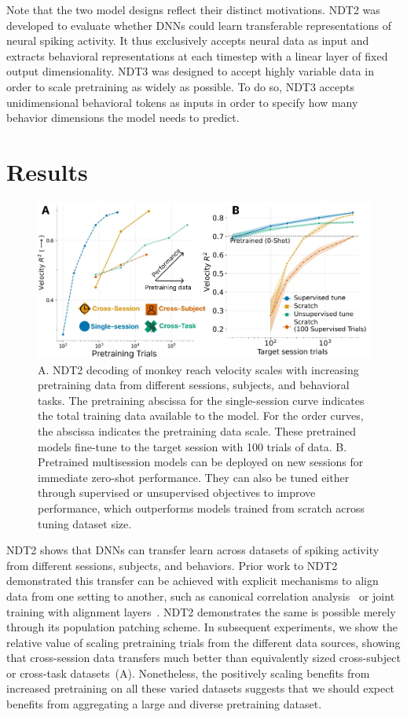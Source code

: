 \documentclass[12pt,oneside]{report}
\begin{document}
Note that the two model designs reflect their distinct motivations. NDT2 was developed to evaluate whether DNNs could learn transferable representations of neural spiking activity. It thus exclusively accepts neural data as input and extracts behavioral representations at each timestep with a linear layer of fixed output dimensionality. NDT3 was designed to accept highly variable data in order to scale pretraining as widely as possible. To do so, NDT3 accepts unidimensional behavioral tokens as inputs in order to specify how many behavior dimensions the model needs to predict.

\section{Results}


\begin{figure}[h]
  \centering
  \includegraphics[width=0.8\linewidth]{ch2_ndt2_results.png}
  \caption{A. NDT2 decoding of monkey reach velocity scales with increasing pretraining data from different sessions, subjects, and behavioral tasks. The pretraining abscissa for the single-session curve indicates the total training data available to the model. For the order curves, the abscissa indicates the pretraining data scale. These pretrained models fine-tune to the target session with 100 trials of data. B. Pretrained multisession models can be deployed on new sessions for immediate zero-shot performance. They can also be tuned either through supervised or unsupervised objectives to improve performance, which outperforms models trained from scratch across tuning dataset size.}
  \label{fig:ndt2_results}
\end{figure}


NDT2 shows that DNNs can transfer learn across datasets of spiking activity from different sessions, subjects, and behaviors. Prior work to NDT2 demonstrated this transfer can be achieved with explicit mechanisms to align data from one setting to another, such as canonical correlation analysis~\citep{gallego_18_task} or joint training with alignment layers~\citep{pandarinath_18_lfads,turaga_13_stitch}. NDT2 demonstrates the same is possible merely through its population patching scheme. In subsequent experiments, we show the relative value of scaling pretraining trials from the different data sources, showing that cross-session data transfers much better than equivalently sized cross-subject or cross-task datasets~(A). Nonetheless, the positively scaling benefits from increased pretraining on all these varied datasets suggests that we should expect benefits from aggregating a large and diverse pretraining dataset.
\end{document}
